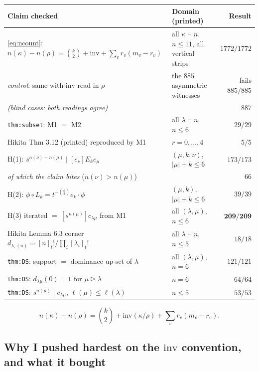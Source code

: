 \documentclass[11pt]{article}
\begin{document}
\begin{center}
\small
\begin{tabular}{@{}p{}p{}r@{}}
\toprule
\textbf{Claim checked} & \textbf{Domain (printed)} & \textbf{Result}\\
\midrule
\eqref{eq:ncount}: $n(\kappa)-n(\rho)=\binom k2+\mathrm{inv}+\sum_vr_v(m_v-r_v)$
  & all $\kappa\vdash n$, $n\le11$, all vertical strips & $1772/1772$\\
\quad\emph{control}: same with $\mathrm{inv}$ read in $\rho$
  & the $885$ asymmetric witnesses & fails $885/885$\\
\quad\emph{(blind cases: both readings agree)} & & $887$\\
\texttt{thm:subset}: M1 $=$ M2
  & all $\lambda\vdash n$, $n\le6$ & $29/29$\\
Hikita Thm 3.12 (printed) reproduced by M1
  & $r=0,\dots,4$ & $5/5$\\
H(1): $s^{n(\nu)-n(\mu)}\mid[e_\nu]E_ke_\mu$
  & $(\mu,k,\nu)$, $|\mu|+k\le6$ & $173/173$\\
\quad\emph{of which the claim bites} ($n(\nu)>n(\mu)$) & & $66$\\
H(2): $\phi\circ L_k=t^{-\binom k2}e_k\cdot\phi$
  & $(\mu,k)$, $|\mu|+k\le6$ & $39/39$\\
H(3) iterated $=\ [s^{n(\mu)}]c_{\lambda\mu}$ from M1
  & all $(\lambda,\mu)$, $n\le6$ & $\mathbf{209/209}$\\
Hikita Lemma 6.3 corner $d_{\lambda,(n)}=[n]_t!/\prod_i[\lambda_i]_t!$
  & all $\lambda\vdash n$, $n\le5$ & $18/18$\\
\texttt{thm:DS}: support $=$ dominance up-set of $\lambda$ & all $(\lambda,\mu)$, $n=6$ & $121/121$\\
\texttt{thm:DS}: $d_{\lambda\mu}(0)=1$ for $\mu\trianglerighteq\lambda$ & $n=6$ & $64/64$\\
\texttt{thm:DS}: $s^{n(\mu)}\mid c_{\lambda\mu}$, $\ell(\mu)\le\ell(\lambda)$ & $n\le5$ & $53/53$\\
\bottomrule
\end{tabular}
\end{center}

\begin{equation}\label{eq:ncount}
n(\kappa)-n(\rho)=\binom k2+\mathrm{inv}(\kappa/\rho)+\sum_vr_v(m_v-r_v).
\end{equation}

\subsection{Why I pushed hardest on the \texorpdfstring{$\mathrm{inv}$}{inv} convention, and what it bought}
\end{document}

